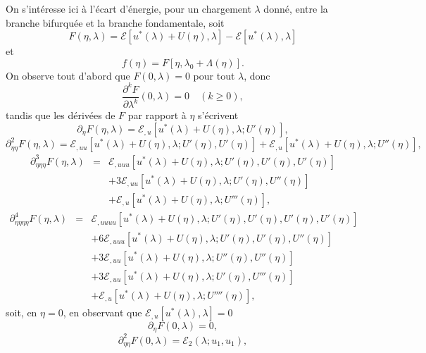 \documentclass{article}
\newcommand{\nosymbol}{}
\begin{document}
On s'intéresse ici à l'écart d'énergie, pour un chargement
$\lambda$ donné, entre la branche bifurquée et la branche
fondamentale, soit
\[ F (\eta, \lambda) =\mathcal{E} [u^{\ast} (\lambda) + U (\eta), \lambda]
   -\mathcal{E} [u^{\ast} (\lambda), \lambda] \]
et
\[ f (\eta) = F [\eta, \lambda_0 + \Lambda (\eta)] . \]
On observe tout d'abord que $F (0, \lambda) = 0$ pour tout $\lambda$, donc
\[ \frac{\partial^k F}{\partial \lambda^k} (0, \lambda) = 0 \quad (k \geq 0),
\]
tandis que les dérivées de $F$ par rapport à $\eta$ s'écrivent
\[ \partial_{\eta} F (\eta, \lambda) =\mathcal{E}_{, u} [u^{\ast} (\lambda) +
   U (\eta), \lambda ; U' (\eta)], \]
\[ \partial_{\eta  \eta}^2 F (\eta, \lambda) =\mathcal{E}_{, u
    u} [u^{\ast} (\lambda) + U (\eta), \lambda ; U' (\eta), U' (\eta)]
   +\mathcal{E}_{, u} [u^{\ast} (\lambda) + U (\eta), \lambda ; U'' (\eta)],
\]
\begin{eqnarray*}
  \partial_{\eta  \eta  \eta}^3 F (\eta, \lambda) & = &
  \mathcal{E}_{, u  u  u} [u^{\ast} (\lambda) + U (\eta),
  \lambda ; U' (\eta), U' (\eta), U' (\eta)]\\
  &  & \nosymbol \nosymbol \nosymbol + 3\mathcal{E}_{, u  u}
  [u^{\ast} (\lambda) + U (\eta), \lambda ; U' (\eta), U'' (\eta)]\\
  &  & \nosymbol \nosymbol \nosymbol +\mathcal{E}_{, u} [u^{\ast} (\lambda) +
  U (\eta), \lambda ; U''' (\eta)],
\end{eqnarray*}
\begin{eqnarray}
  \partial_{\eta  \eta  \eta  \eta}^4 F (\eta,
  \lambda) & = & \mathcal{E}_{, u  u  u  u} [u^{\ast}
  (\lambda) + U (\eta), \lambda ; U' (\eta), U' (\eta), U' (\eta), U' (\eta)]
  \nonumber\\
  &  & \nosymbol + 6\mathcal{E}_{, u  u  u} [u^{\ast}
  (\lambda) + U (\eta), \lambda ; U' (\eta), U' (\eta), U'' (\eta)]
  \nonumber\\
  &  & \nosymbol + 3\mathcal{E}_{, u  u} [u^{\ast} (\lambda) + U
  (\eta), \lambda ; U'' (\eta), U'' (\eta)] \nonumber\\
  &  & \nosymbol + 3\mathcal{E}_{, u  u} [u^{\ast} (\lambda) + U
  (\eta), \lambda ; U' (\eta), U''' (\eta)] \nonumber\\
  &  & \nosymbol +\mathcal{E}_{, u} [u^{\ast} (\lambda) + U (\eta), \lambda ;
  U'''' (\eta)], \nonumber
\end{eqnarray}
soit, en $\eta = 0$, en observant que $\mathcal{E}_{, u} [u^{\ast} (\lambda),
\lambda] = 0$
\[ \partial_{\eta} F (0, \lambda) = 0, \]
\[ \partial_{\eta  \eta}^2 F (0, \lambda) =\mathcal{E}_2 (\lambda ;
   u_1, u_1), \]
\end{document}
